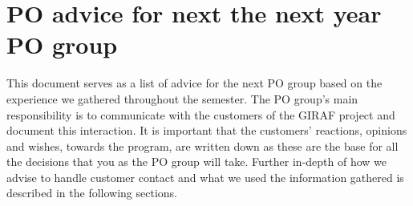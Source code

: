 \section{PO advice for next the next year PO group} \label{appendix:PO-advice}

This document serves as a list of advice for the next PO group based on the experience we gathered throughout the semester.
The PO group's main responsibility is to communicate with the customers of the GIRAF project and document this interaction.
It is important that the customers' reactions, opinions and wishes, towards the program, are written down as these are the base for all the decisions that you as the PO group will take.
Further in-depth of how we advise to handle customer contact and what we used the information gathered is described in the following sections.

